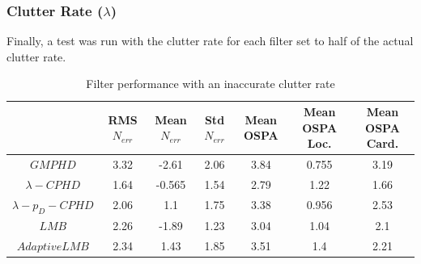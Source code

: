 \documentclass{article}
\begin{document}
\subsubsection{Clutter Rate ($\lambda$)}
Finally, a test was run with the clutter rate for each filter set to half of the actual clutter rate.
\begin{table}[H]
  \centering
  \begin{tabular}{ c| c | c | c | c | c | c }
    & RMS $N_{err}$ & Mean $N_{err}$ & Std $N_{err}$ & Mean OSPA & Mean OSPA Loc. & Mean OSPA Card.\\
    \hline
    $GMPHD$ & 3.32 & -2.61 & 2.06 & 3.84 & 0.755 & 3.19 \\
    $\lambda-CPHD$ & 1.64 & -0.565 & 1.54 & 2.79 & 1.22 & 1.66 \\
    $\lambda-p_D-CPHD$ & 2.06 & 1.1 & 1.75 & 3.38 & 0.956 & 2.53 \\
    $LMB$ & 2.26 & -1.89 & 1.23 & 3.04 & 1.04 & 2.1 \\
  $Adaptive LMB$ & 2.34 & 1.43 & 1.85 & 3.51 & 1.4 & 2.21 \\
\end{tabular}  
  \caption{Filter performance with an inaccurate clutter rate}
  \label{tab:low_clutter}
\end{table}
\end{document}
